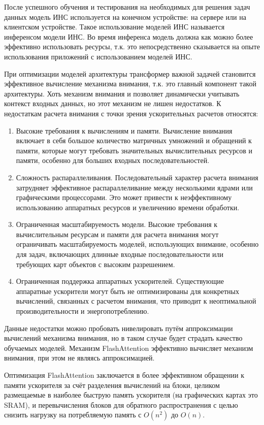 После успешного обучения и тестирования на необходимых для решения задач данных модель ИНС используется на конечном устройстве: на сервере или на клиентском устройстве. Такое использование моделей ИНС называется инференсом модели ИНС. Во время инференса модель должна как можно более эффективно использовать ресурсы, т.к. это непосредственно сказывается на опыте использования приложений с использованием моделей ИНС.

При оптимизации моделей архитектуры трансформер важной задачей становится эффективное вычисление механизма внимания, т.к. это главный компонент такой архитектуры. Хоть механизм внимания и позволяет динамически учитывать контекст входных данных, но этот механизм не лишен недостатков. К недостаткам расчета внимания с точки зрения ускорительных расчетов относятся:
\begin{enumerate}
    \item Высокие требования к вычислениям и памяти. Вычисление внимания включает в себя большое количество матричных умножений и обращений к памяти, которые могут требовать значительных вычислительных ресурсов и памяти, особенно для больших входных последовательностей.
    \item Сложность распараллеливания. Последовательный характер расчета внимания затрудняет эффективное распараллеливание между несколькими ядрами или графическими процессорами. Это может привести к неэффективному использованию аппаратных ресурсов и увеличению времени обработки.
    \item Ограниченная масштабируемость модели. Высокие требования к вычислительным ресурсам и памяти для расчета внимания могут ограничивать масштабируемость моделей, использующих внимание, особенно для задач, включающих длинные входные последовательности или требующих карт объектов с высоким разрешением.
    \item Ограниченная поддержка аппаратных ускорителей. Существующие аппаратные ускорители могут быть не оптимизированы для конкретных вычислений, связанных с расчетом внимания, что приводит к неоптимальной производительности и энергопотреблению.
\end{enumerate}

Данные недостатки можно пробовать нивелировать путём аппроксимации вычислений механизма внимания, но в таком случае будет страдать качество обучаемых моделей. Механизм FlashAttention \cite{flash-attn-paper} эффективно вычисляет механизм внимания, при этом не являясь аппроксимацией.

Оптимизация FlashAttention заключается в более эффективном обращении к памяти ускорителя за счёт разделения вычислений на блоки, целиком размещаемые в наиболее быструю память ускорителя (на графических картах это SRAM), и перевычисления блоков для обратного распространения с целью снизить нагрузку на потребляемую память с $O(n^2)$ до $O(n)$.

